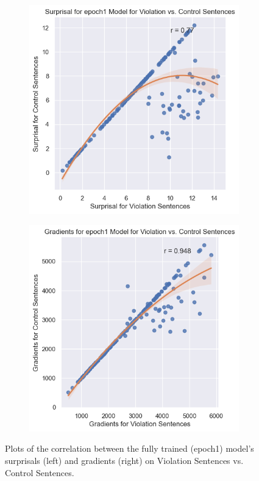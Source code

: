 \documentclass{IEEEtran}
\begin{document}
\begin{figure}[h]
    \centering
    \begin{subfigure}{0.4\textwidth}
        \centering
        \includegraphics[width=\textwidth]{surprisal_violations_vs_control/epoch1.png}
    \end{subfigure}
    \begin{subfigure}{0.4\textwidth}
        \centering
        \includegraphics[width=\textwidth]{gradients_violations_vs_control/epoch1.png}
    \end{subfigure}
    \caption{Plots of the correlation between the fully trained (epoch1) model's surprisals (left) and gradients (right) on Violation Sentences vs. Control Sentences.}
    \label{fig:epoch1_correlations}
\end{figure}
\end{document}
